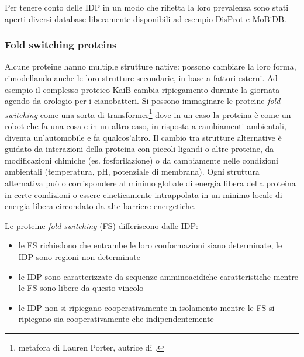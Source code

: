 {\par Per tenere conto delle IDP in un modo che rifletta la loro prevalenza sono stati aperti diversi database liberamente disponibili ad esempio \href{http://www.disprot.org}{DisProt} e \href{http://MoBiDB.bio.unipd.it}{MoBiDB}.

\subsubsection{Fold switching proteins} \label{sec:fold-switching-proteins}
{
Alcune proteine hanno multiple strutture native: possono cambiare la loro forma, rimodellando anche le loro strutture secondarie, in base a fattori esterni. Ad esempio il complesso proteico KaiB cambia ripiegamento durante la giornata agendo da orologio per i cianobatteri. Si possono immaginare le proteine \textit{fold switching} come una sorta di transformer\footnote{metafora di Lauren Porter\supercite{porterYT}, autrice di .} dove in un caso la proteina è come un robot che fa una cosa e in un altro caso, in risposta a cambiamenti ambientali, diventa un'automobile e fa qualcos'altro. Il cambio tra strutture alternative è guidato da interazioni della proteina con piccoli ligandi o altre proteine, da modificazioni chimiche (es. fosforilazione) o da cambiamente nelle condizioni ambientali (temperatura, pH, potenziale di membrana). Ogni struttura alternativa può o corrispondere al minimo globale di energia libera della proteina in certe condizioni o essere cineticamente intrappolata in un minimo locale di energia libera\supercite{varela2019kinetic} circondato da alte barriere energetiche.

\par Le proteine \textit{fold switching} (FS) differiscono dalle IDP\supercite{porter2018extant}: 

\begin{itemize}
	\item le FS richiedono che entrambe le loro conformazioni siano determinate, le IDP sono regioni non determinate
	\item le IDP sono caratterizzate da sequenze amminoacidiche caratteristiche mentre le FS sono libere da questo vincolo
	\item le IDP non si ripiegano cooperativamente in isolamento mentre le FS si ripiegano sia cooperativamente che indipendentemente
\end{itemize}

}}
